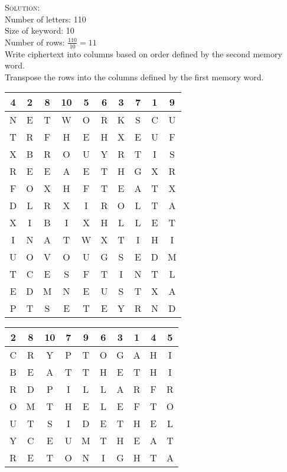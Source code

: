 \documentclass[12pt]{article}
\newenvironment{solution}
    {\textsc{Solution:}\\}
    {\newpage}%
\begin{document}
\begin{solution}
		Number of letters: 110\\
		Size of keyword: 10\\
		Number of rows: $\frac{110}{10} = 11$\\
		Write ciphertext into columns based on order defined by the second memory word.\\
		Transpose the rows into the columns defined by the first memory word.\\
		\begin{center}
			\begin{tabular}{|c|c|c|c|c|c|c|c|c|c|}
				\hline
				4 & 2 & 8 & 10 & 5 & 6 & 3 & 7 & 1 & 9 \\ \hline
				N & E & T & W  & O & R & K & S & C & U \\ \hline
				T & R & F & H  & E & H & X & E & U & F \\
				X & B & R & O  & U & Y & R & T & I & S \\
				R & E & E & A  & E & T & H & G & X & R \\
				F & O & X & H  & F & T & E & A & T & X \\
				D & L & R & X  & I & R & O & L & T & A \\
				X & I & B & I  & X & H & L & L & E & T \\
				I & N & A & T  & W & X & T & I & H & I \\
				U & O & V & O  & U & G & S & E & D & M \\
				T & C & E & S  & F & T & I & N & T & L \\
				E & D & M & N  & E & U & S & T & X & A \\
				P & T & S & E  & T & E & Y & R & N & D \\ \hline
			\end{tabular}
			\quad
			\begin{tabular}{|c|c|c|c|c|c|c|c|c|c|}
				\hline
				2 & 8 & 10 & 7 & 9 & 6 & 3 & 1 & 4 & 5 \\ \hline
				C & R & Y  & P & T & O & G & A & H & I \\ \hline
				B & E & A  & T & T & H & E & T & H & I \\
				R & D & P  & I & L & L & A & R & F & R \\
				O & M & T  & H & E & L & E & F & T & O \\
				U & T & S  & I & D & E & T & H & E & L \\
				Y & C & E  & U & M & T & H & E & A & T \\
				R & E & T  & O & N & I & G & H & T & A \\

\end{tabular}
\end{center}
\end{solution}
\end{document}
